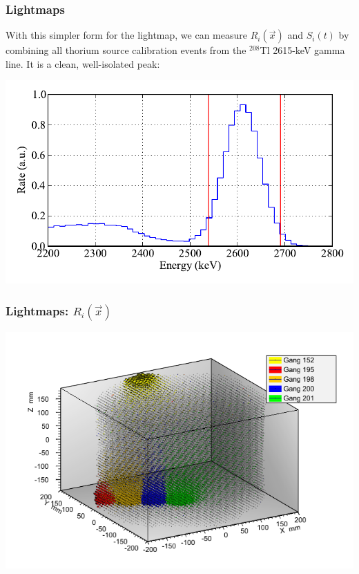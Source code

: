 \documentclass{beamer}
\begin{document}
\begin{frame}
\begin{center}
\frametitle{Lightmaps}
\end{center}
\vspace{1cm}
With this simpler form for the lightmap, we can measure $R_i(\vec{x})$ and $S_i(t)$ by combining all thorium source calibration events from the $^{208}$Tl 2615-keV gamma line.  It is a clean, well-isolated peak:
\begin{center}
\includegraphics[keepaspectratio=true,width=\textwidth]{Th_lightmap_cuts.pdf}
\end{center}
\end{frame}

\begin{frame}
\begin{center}
\frametitle{Lightmaps: $R_i(\vec{x})$}
\end{center}
\begin{center}
\includegraphics[keepaspectratio=true,width=\textwidth,clip=true,trim=15mm 10mm 10mm 10mm]{Lightmap_viz_zoom.png}
\end{center}
\end{frame}
\end{document}
